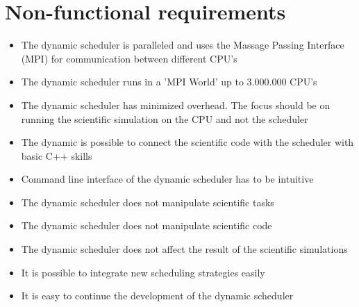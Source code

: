 {
\setcounter{funcNFR}{10}
\renewcommand{\labelitemi}{
	\ifnum \value{funcNFR}<10$/NF 0\arabic{funcNFR} /$\addtocounter{funcNFR}{10}
	\else $/NF \arabic{funcNFR} /$\addtocounter{funcNFR}{10}\fi
}

\section{Non-functional requirements}
	\begin{itemize}
		\item The dynamic scheduler is paralleled and uses the Massage Passing Interface (MPI) for communication between different CPU's
		\item The dynamic scheduler runs in a 'MPI World' up to 3.000.000 CPU's
		\item The dynamic scheduler has minimized overhead. The focus should be on running the scientific simulation on the CPU and not the scheduler
		\item The dynamic is possible to connect the scientific code with the scheduler with basic C++ skills
		\item Command line interface of the dynamic scheduler has to be intuitive
		\item The dynamic scheduler does not manipulate scientific tasks
		\item The dynamic scheduler does not manipulate scientific code
		\item The dynamic scheduler does not affect the result of the scientific simulations
		\item It is possible to integrate new scheduling strategies easily
		\item It is easy to continue the development of the dynamic scheduler
	\end{itemize}
}